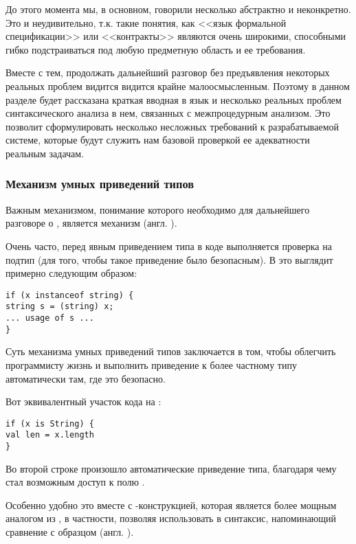 До этого момента мы, в основном, говорили несколько абстрактно и неконкретно. Это и неудивительно, т.к. такие понятия, как <<язык формальной спецификации>> или <<контракты>> являются очень широкими, способными гибко подстраиваться под любую предметную область и ее требования.

Вместе с тем, продолжать дальнейший разговор без предъявления некоторых реальных проблем видится видится крайне малоосмысленным. Поэтому в данном разделе будет рассказана краткая вводная в язык  и несколько реальных проблем синтаксического анализа в нем, связанных с межпроцедурным анализом. Это позволит сформулировать несколько несложных требований к разрабатываемой системе, которые будут служить нам базовой проверкой ее адекватности реальным задачам.


\subsubsection{Механизм умных приведений типов}

Важным механизмом, понимание которого необходимо для дальнейшего разговоре о , является механизм  (англ. ). 

Очень часто, перед явным приведением типа в коде выполняется проверка на подтип (для того, чтобы такое приведение было безопасным). В  это выглядит примерно следующим образом:

\begin{verbatim}
if (x instanceof string) {
string s = (string) x;
... usage of s ...
}
\end{verbatim}

Суть механизма умных приведений типов заключается в том, чтобы облегчить программисту жизнь и выполнить приведение к более частному типу автоматически там, где это безопасно. 

Вот эквивалентный участок кода на : 

\begin{verbatim}
if (x is String) {
val len = x.length
}
\end{verbatim}

Во второй строке произошло автоматические приведение типа, благодаря чему стал возможным доступ к полю .

Особенно удобно это вместе с -конструкцией, которая является более мощным аналогом  из , в частности, позволяя использовать в  синтаксис, напоминающий сравнение с образцом (англ. ).

